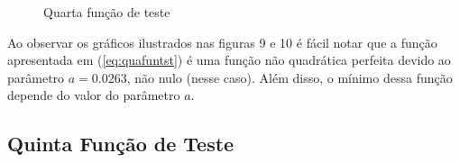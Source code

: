 \begin{figure}[h!]
    \centering 
    \qquad
    \qquad
    \caption{Quarta função de teste}%
    \label{fig:quafun}%
\end{figure}
\FloatBarrier

Ao observar os gráficos ilustrados nas figuras 9 e 10 é fácil notar que a função apresentada em (\ref{eq:quafuntst}) é uma função não quadrática perfeita devido ao parâmetro $a = 0.0263$, não nulo (nesse caso). Além disso, o mínimo dessa função depende do valor do parâmetro $a$.

\subsection{Quinta Função de Teste}\label{sec:quifun}

